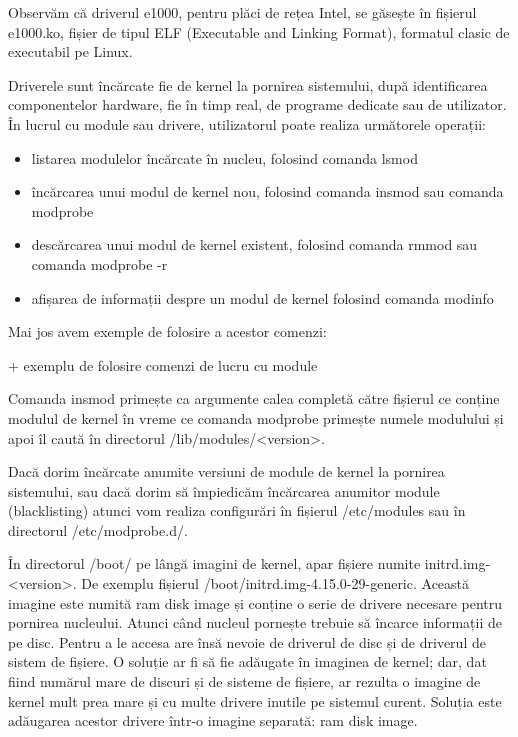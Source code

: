 
Observăm că driverul e1000, pentru plăci de rețea Intel, se găsește în fișierul
e1000.ko, fișier de tipul ELF (Executable and Linking Format), formatul clasic
de executabil pe Linux.

Driverele sunt încărcate fie de kernel la pornirea sistemului, după
identificarea componentelor hardware, fie în timp real, de programe dedicate sau
de utilizator. În lucrul cu module sau drivere, utilizatorul poate realiza
următorele operații:

\begin{itemize}
	\item listarea modulelor încărcate în nucleu, folosind comanda lsmod
	\item încărcarea unui modul de kernel nou, folosind comanda insmod sau
		comanda modprobe
	\item descărcarea unui modul de kernel existent, folosind comanda rmmod
		sau comanda modprobe -r
	\item afișarea de informații despre un modul de kernel folosind comanda
		modinfo
\end{itemize}

Mai jos avem exemple de folosire a acestor comenzi:

+ exemplu de folosire comenzi de lucru cu module

Comanda insmod primește ca argumente calea completă către fișierul ce conține
modulul de kernel în vreme ce comanda modprobe primește numele modulului și apoi
îl caută în directorul /lib/modules/<version>.

Dacă dorim încărcate anumite versiuni de module de kernel la pornirea
sistemului, sau dacă dorim să împiedicăm încărcarea anumitor module
(blacklisting) atunci vom realiza configurări în fișierul /etc/modules sau în
directorul /etc/modprobe.d/.

În directorul /boot/ pe lângă imagini de kernel, apar fișiere numite
initrd.img-<version>. De exemplu fișierul /boot/initrd.img-4.15.0-29-generic.
Această imagine este numită ram disk image și conține o serie de drivere
necesare pentru pornirea nucleului. Atunci când nucleul pornește trebuie să
încarce informații de pe disc. Pentru a le accesa are însă nevoie de driverul de
disc și de driverul de sistem de fișiere. O soluție ar fi să fie adăugate în
imaginea de kernel; dar, dat fiind numărul mare de discuri și de sisteme de
fișiere, ar rezulta o imagine de kernel mult prea mare și cu multe drivere
inutile pe sistemul curent. Soluția este adăugarea acestor drivere într-o
imagine separată: ram disk image.

